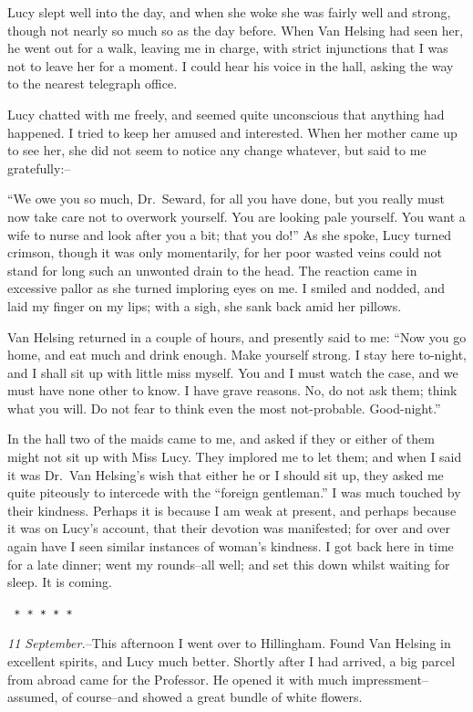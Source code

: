 \documentclass[12pt,openright]{book}
\begin{document}
Lucy slept well into the day, and when she woke she was fairly well and strong, though not nearly so much so as the day before. When Van Helsing had seen her, he went out for a walk, leaving me in charge, with strict injunctions that I was not to leave her for a moment. I could hear his voice in the hall, asking the way to the nearest telegraph office.

Lucy chatted with me freely, and seemed quite unconscious that anything had happened. I tried to keep her amused and interested. When her mother came up to see her, she did not seem to notice any change whatever, but said to me gratefully:–

“We owe you so much, Dr. Seward, for all you have done, but you really must now take care not to overwork yourself. You are looking pale yourself. You want a wife to nurse and look after you a bit; that you do!” As she spoke, Lucy turned crimson, though it was only momentarily, for her poor wasted veins could not stand for long such an unwonted drain to the head. The reaction came in excessive pallor as she turned imploring eyes on me. I smiled and nodded, and laid my finger on my lips; with a sigh, she sank back amid her pillows.

Van Helsing returned in a couple of hours, and presently said to me: “Now you go home, and eat much and drink enough. Make yourself strong. I stay here to-night, and I shall sit up with little miss myself. You and I must watch the case, and we must have none other to know. I have grave reasons. No, do not ask them; think what you will. Do not fear to think even the most not-probable. Good-night.”

In the hall two of the maids came to me, and asked if they or either of them might not sit up with Miss Lucy. They implored me to let them; and when I said it was Dr. Van Helsing’s wish that either he or I should sit up, they asked me quite piteously to intercede with the “foreign gentleman.” I was much touched by their kindness. Perhaps it is because I am weak at present, and perhaps because it was on Lucy’s account, that their devotion was manifested; for over and over again have I seen similar instances of woman’s kindness. I got back here in time for a late dinner; went my rounds–all well; and set this down whilst waiting for sleep. It is coming.

\texttt{   *       *       *       *       *}

\textit{11 September.}–This afternoon I went over to Hillingham. Found Van Helsing in excellent spirits, and Lucy much better. Shortly after I had arrived, a big parcel from abroad came for the Professor. He opened it with much impressment–assumed, of course–and showed a great bundle of white flowers.
\end{document}
